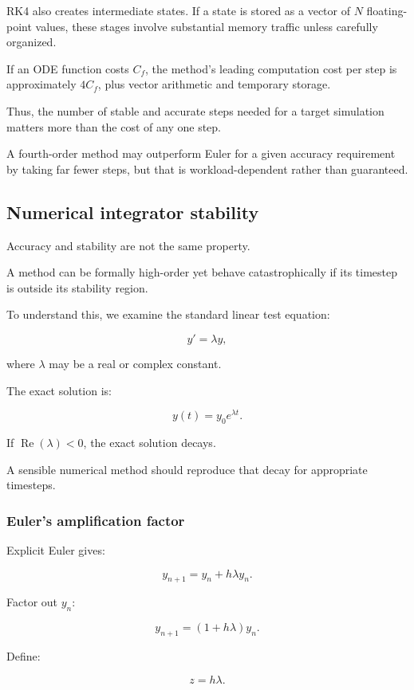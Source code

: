RK4 also creates intermediate states. If a state is stored as a vector of \(N\) floating-point values, these stages involve substantial memory traffic unless carefully organized.

If an ODE function costs \(C_f\), the method's leading computation cost per step is approximately \(4C_f\), plus vector arithmetic and temporary storage.

Thus, the number of stable and accurate steps needed for a target simulation matters more than the cost of any one step.

A fourth-order method may outperform Euler for a given accuracy requirement by taking far fewer steps, but that is workload-dependent rather than guaranteed.

\subsection{Numerical integrator stability}\label{02-foundations-ii-ch025-numerical-integrator-stability}

Accuracy and stability are not the same property.

A method can be formally high-order yet behave catastrophically if its timestep is outside its stability region.

To understand this, we examine the standard linear test equation:

\[
\boxed{y'=\lambda y},
\]

where \(\lambda\) may be a real or complex constant.

The exact solution is:

\[
y(t)=y_0e^{\lambda t}.
\]

If \(\operatorname{Re}(\lambda)<0\), the exact solution decays.

A sensible numerical method should reproduce that decay for appropriate timesteps.

\subsubsection{Euler's amplification factor}\label{02-foundations-ii-ch025-eulers-amplification-factor}

Explicit Euler gives:

\[
y_{n+1}=y_n+h\lambda y_n.
\]

Factor out \(y_n\):

\[
\boxed{ y_{n+1}=(1+h\lambda)y_n }.
\]

Define:

\[
z=h\lambda.
\]

